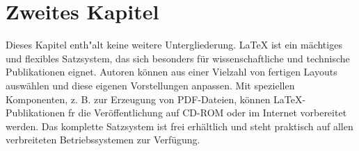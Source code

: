 \documentclass[a4paper,onecolumn,draft,pdftex]{report}
\begin{document}
\chapter{Zweites Kapitel}
Dieses Kapitel enth"alt keine weitere Untergliederung.
LaTeX ist ein m\"achtiges und flexibles Satzsystem, das sich besonders f\"ur
wissenschaftliche und technische Publikationen eignet. Autoren k\"onnen
aus einer Vielzahl von fertigen Layouts ausw\"ahlen und diese eigenen 
Vorstellungen anpassen. Mit speziellen Komponenten, z. B. zur Erzeugung 
von PDF-Dateien, k\"onnen LaTeX-Publikationen fr die Ver\"offentlichung 
auf CD-ROM oder im Internet vorbereitet werden. Das komplette Satzsystem 
ist frei erh\"altlich und steht praktisch auf allen verbreiteten Betriebssystemen 
zur Verf\"ugung.
\end{document}
